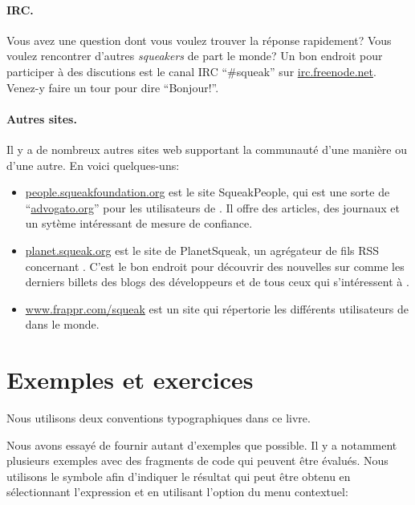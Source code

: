 \documentclass[a4paper,10pt,twoside]{book}
\begin{document}
\paragraph{IRC.}
Vous avez une question dont vous voulez trouver la r\'eponse
rapidement? Vous voulez rencontrer d'autres \emph{squeakers} de part
le monde? Un bon endroit pour participer \`a des discutions est le
canal IRC ``\#squeak'' sur \url{irc.freenode.net}. 
Venez-y faire un tour pour dire ``Bonjour!''.

\paragraph{Autres sites.} Il y a de nombreux autres sites web supportant la communaut\'e \sq d'une mani\`ere ou d'une autre. En voici quelques-uns:
\begin{itemize}
  \item \url{people.squeakfoundation.org} est le site
    \textsf{SqueakPeople}, qui est une sorte de
    ``\url{advogato.org}'' pour les utilisateurs de \sq. Il offre des
    articles, des journaux et un syt\`eme int\'eressant de mesure de confiance.

  \item \url{planet.squeak.org} est le site de \textsf{PlanetSqueak},
    un agr\'egateur de fils RSS concernant \sq. C'est le bon endroit
    pour d\'ecouvrir des nouvelles sur \sq comme les derniers billets
    des blogs des d\'eveloppeurs et de tous ceux qui s'int\'eressent \`a \sq.

  \item \url{www.frappr.com/squeak} est un site qui r\'epertorie les
    diff\'erents utilisateurs de \sq dans le monde.

\end{itemize}


\section*{Exemples et exercices}

Nous utilisons deux conventions typographiques dans ce livre.

Nous avons essay\'e de fournir autant d'exemples que possible.
Il y a notamment plusieurs exemples avec des fragments de code qui
peuvent \^etre \'evalu\'es. Nous utilisons le symbole \ct{-->} afin
d'indiquer le r\'esultat qui peut \^etre obtenu en s\'electionnant
l'expression et en utilisant l'option  du menu contextuel:
\end{document}
